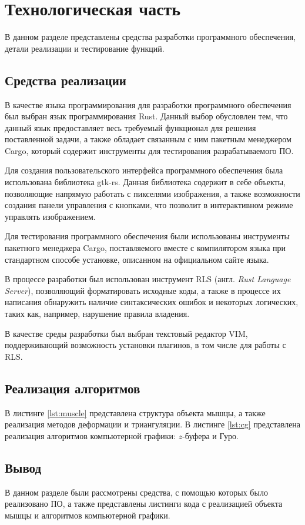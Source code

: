 \chapter{Технологическая часть}

В данном разделе представлены средства разработки программного обеспечения, детали реализации и тестирование функций.

\section{Средства реализации}

В качестве языка программирования для разработки программного обеспечения был выбран язык программирования Rust\cite{rust}. Данный выбор обусловлен тем, что данный язык предоставляет весь требуемый функционал для решения поставленной задачи, а также обладает связанным с ним пакетным менеджером Cargo\cite{cargo}, который содержит инструменты для тестирования разрабатываемого ПО\cite{rusttest}.

Для создания пользовательского интерфейса программного обеспечения была использована библиотека gtk-rs\cite{gtk-rs}. Данная библиотека содержит в себе объекты, позволяющие напрямую работать с пикселями изображения, а также возможности создания панели управления с кнопками, что позволит в интерактивном режиме управлять изображением.

Для тестирования программного обеспечения были использованы инструменты пакетного менеджера Cargo\cite{cargo}, поставляемого вместе с компилятором языка при стандартном способе установке, описанном на официальном сайте языка\cite{rust}. 

В процессе разработки был использован инструмент RLS\cite{rls} (англ. \textit{Rust Language Server}), позволяющий форматировать исходные коды, а также в процессе их написания обнаружить наличие синтаксических ошибок и некоторых логических, таких как, например, нарушение правила владения\cite{rust-learn}.

В качестве среды разработки был выбран текстовый редактор VIM\cite{vim}, поддерживающий возможность установки плагинов\cite{vim-plugins}, в том числе для работы с RLS\cite{rls}.

\section{Реализация алгоритмов}

В листинге \ref{lst:muscle} представлена структура объекта мышцы, а также реализация методов деформации и триангуляции. В листинге \ref{lst:cg} представлена реализация алгоритмов компьютерной графики: $z$-буфера и Гуро.



\section*{Вывод}

В данном разделе были рассмотрены средства, с помощью которых было реализовано ПО, а также представлены листинги кода с реализацией объекта мышцы и алгоритмов компьютерной графики.
